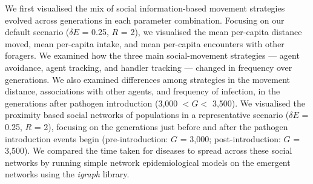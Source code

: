 We first visualised the mix of social information-based movement strategies evolved across generations in each parameter combination.
Focusing on our default scenario ($\delta E$ = 0.25, $R$ = 2), we visualised the mean per-capita distance moved, mean per-capita intake, and mean per-capita encounters with other foragers.
We examined how the three main social-movement strategies --- agent avoidance, agent tracking, and handler tracking --- changed in frequency over generations.
We also examined differences among strategies in the movement distance, associations with other agents, and frequency of infection, in the generations after pathogen introduction (3,000 $< G <$ 3,500).
We visualised the proximity based social networks of populations in a representative scenario ($\delta E$ = 0.25, $R$ = 2), focusing on the generations just before and after the pathogen introduction events begin (pre-introduction: $G$ = 3,000; post-introduction: $G$ = 3,500).
We compared the time taken for diseases to spread across these social networks by running simple network epidemiological models on the emergent networks \citep{bailey1975,white2017,stroeymeyt2018} using the \textit{igraph} \citep{csardi2006} library.




